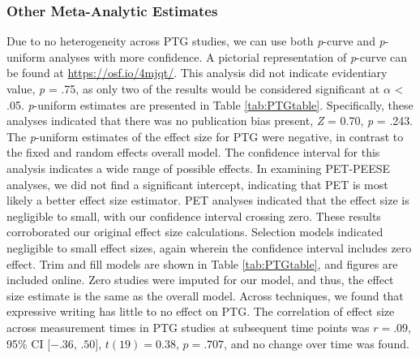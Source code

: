 \documentclass[man, mask]{apa6}
\theoremstyle{definition}
\theoremstyle{definition}
\theoremstyle{definition}
\theoremstyle{remark}
\begin{document}
\subsubsection{Other Meta-Analytic
Estimates}\label{other-meta-analytic-estimates-1}

Due to no heterogeneity across PTG studies, we can use both
\emph{p}-curve and \emph{p}-uniform analyses with more confidence. A
pictorial representation of \emph{p}-curve can be found at
\url{https://osf.io/4mjqt/}. This analysis did not indicate evidentiary
value, \emph{p} = .75, as only two of the results would be considered
significant at \(\alpha\) \textless{} .05. \emph{p}-uniform estimates
are presented in Table \ref{tab:PTGtable}. Specifically, these analyses
indicated that there was no publication bias present, \emph{Z} = 0.70,
\emph{p} = .243. The \emph{p}-uniform estimates of the effect size for
PTG were negative, in contrast to the fixed and random effects overall
model. The confidence interval for this analysis indicates a wide range
of possible effects. In examining PET-PEESE analyses, we did not find a
significant intercept, indicating that PET is most likely a better
effect size estimator. PET analyses indicated that the effect size is
negligible to small, with our confidence interval crossing zero. These
results corroborated our original effect size calculations. Selection
models indicated negligible to small effect sizes, again wherein the
confidence interval includes zero effect. Trim and fill models are shown
in Table \ref{tab:PTGtable}, and figures are included online. Zero
studies were imputed for our model, and thus, the effect size estimate
is the same as the overall model. Across techniques, we found that
expressive writing has little to no effect on PTG. The correlation of
effect size across measurement times in PTG studies at subsequent time
points was \(r = .09\), 95\% CI \([-.36\), \(.50]\), \(t(19) = 0.38\),
\(p = .707\), and no change over time was found.
\end{document}
